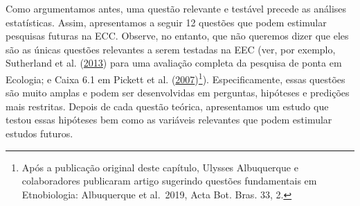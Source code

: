 \documentclass[
]{article}
\begin{document}
Como argumentamos antes, uma questão relevante e testável precede as análises estatísticas. Assim, apresentamos a seguir 12 questões que podem estimular pesquisas futuras na ECC. Observe, no entanto, que não queremos dizer que eles são as únicas questões relevantes a serem testadas na EEC (ver, por exemplo, Sutherland et al. (\protect\hyperlink{ref-sutherland_identification_2013}{2013}) para uma avaliação completa da pesquisa de ponta em Ecologia; e Caixa 6.1 em Pickett et al. (\protect\hyperlink{ref-pickett_ecological_2007}{2007})\footnote{Após a publicação original deste capítulo, Ulysses Albuquerque e colaboradores publicaram artigo sugerindo questões fundamentais em Etnobiologia: Albuquerque et al.~2019, Acta Bot. Bras. 33, 2.}). Especificamente, essas questões são muito amplas e podem ser desenvolvidas em perguntas, hipóteses e predições mais restritas. Depois de cada questão teórica, apresentamos um estudo que testou essas hipóteses bem como as variáveis relevantes que podem estimular estudos futuros.
\end{document}
